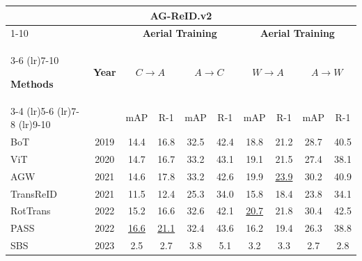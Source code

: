 \documentclass[border=4pt]{standalone}
\begin{document}
\scriptsize
\setlength{\tabcolsep}{6pt}
\begin{tabular}{l c cccc cccc}
            \toprule
            \multicolumn{10}{c}{\textbf{AG-ReID.v2}} \\

            \cmidrule(lr){1-10}

            &
            & \multicolumn{4}{c}{\textbf{Aerial Training}}
            & \multicolumn{4}{c}{\textbf{Aerial Training}} \\

            \cmidrule(lr){3-6} \cmidrule(lr){7-10}

            \textbf{Methods} & \textbf{Year}
            & \multicolumn{2}{c}{$C \rightarrow A$}
            & \multicolumn{2}{c}{$A \rightarrow C$}
            & \multicolumn{2}{c}{$W \rightarrow A$}
            & \multicolumn{2}{c}{$A \rightarrow W$} \\

            \cmidrule(lr){3-4} \cmidrule(lr){5-6} \cmidrule(lr){7-8} \cmidrule(lr){9-10}

            & & mAP & R-1 & mAP & R-1
            & mAP & R-1 & mAP & R-1 \\
            \midrule

            BoT & 2019
            & 14.4 & 16.8 & 32.5 & 42.4
            & 18.8 & 21.2 & 28.7 & 40.5 \\

            ViT & 2020
            & 14.7 & 16.7 & 33.2 & 43.1
            & 19.1 & 21.5 & 27.4 & 38.1 \\

            AGW & 2021
            & 14.6 & 17.8 & 33.2 & 42.6
            & 19.9 & \underline{23.9} & 30.2 & 40.9 \\

            TransReID & 2021
            & 11.5 & 12.4 & 25.3 & 34.0
            & 15.8 & 18.4 & 23.8 & 34.1 \\

            RotTrans & 2022
            & 15.2 & 16.6 & 32.6 & 42.1
            & \underline{20.7} & 21.8 & 30.4 & 42.5 \\

            PASS & 2022
            & \underline{16.6} & \underline{21.1} & 32.4 & 43.6
            & 16.2 & 19.4 & 26.3 & 38.8 \\

            SBS & 2023
            & 2.5 & 2.7 & 3.8 & 5.1
            & 3.2 & 3.3 & 2.7 & 2.8 \\


\end{tabular}
\end{document}
